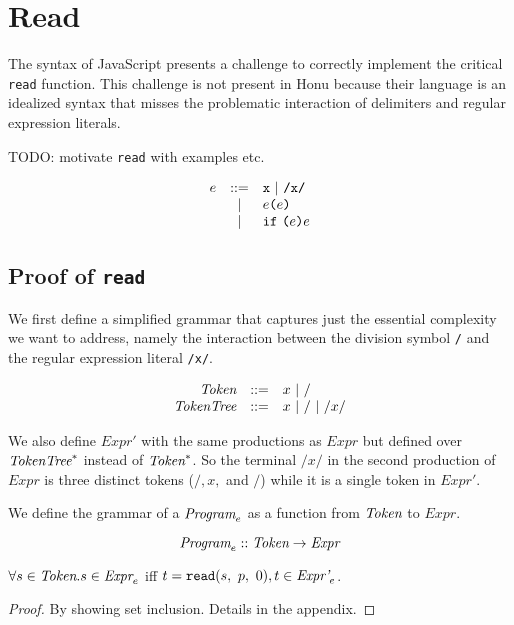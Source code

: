 \documentclass[preprint,10pt]{sigplanconf}
\begin{document}
\section{Read}
\label{sec-3}

The syntax of JavaScript presents a challenge to correctly implement
the critical \texttt{read} function. This challenge is not present in Honu
because their language is an idealized syntax that misses the
problematic interaction of delimiters and regular expression literals.

TODO: motivate \texttt{read} with examples etc.

\[
\begin{array}{rcl}
  e &::=& \texttt{x} ~|~ \texttt{/x/} \\
  &|& e \texttt{(}e\texttt{)} \\
  &|& \texttt{if}~\texttt{(}e\texttt{)}e
\end{array}
\]

\subsection{Proof of \texttt{read}}
\label{sec-3-1}

We first define a simplified grammar that captures just the essential
complexity we want to address, namely the interaction between
the division symbol \texttt{/} and the regular expression literal
\texttt{/x/}.

\[
\begin{array}{rrl}
  \textit{Token} &::=& x ~|~ /
  \\
  \textit{TokenTree} &::=& x ~|~ / ~|~ /x/
  \\
\end{array}
\]

We also define \( \textit{Expr}' \) with the same productions as \(
\textit{Expr} \) but defined over \( \textit{TokenTree}^{*} \) instead of \( \textit{Token}^{*}
\). So the terminal \( /x/ \) in the second production of \(
\textit{Expr} \) is three distinct tokens (\( /, x, \) and \( /
\)) while it is a single token in \( \textit{Expr}' \).

We define the grammar of a \( \textit{Program}_{e} \) as a function from
\( \textit{Token} \) to \( \textit{Expr} \).

\[
\textit{Program}_{e} :: \textit{Token} \rightarrow \textit{Expr}
\]

\begin{theorem}\mbox{}

  \( \forall s \in \textit{Token}. s \in \textit{Expr}_{e} \) iff
  \( t = \texttt{read}(s,~p,~0), t \in \textit{Expr'}_{e} \).
  
\end{theorem}
\begin{proof}\mbox{}
  
By showing set inclusion. Details in the appendix.
\end{proof}
\end{document}
